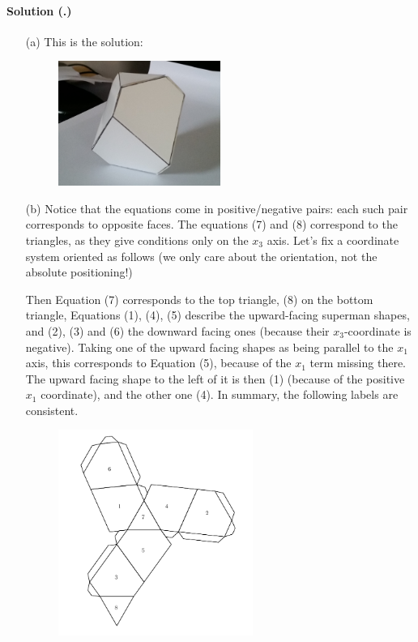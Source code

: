 \documentclass{article}
\newcounter{problemSheetNumber}
\newcounter{problems}
\renewcommand{\solution}[1]{\paragraph{Solution (\theproblemSheetNumber.\theproblems)}\addtocounter{problems}{1}\label{#1}}
\begin{document}
\solution{pr:2} 

\begin{itemize}
 \item[(a)] This is the solution:
\begin{figure}[h!]
 \centering
 \includegraphics[width=0.5\textwidth]{images/durerphoto.jpg}
\end{figure}
\item[(b)]  Notice that the equations come in positive/negative pairs: each such pair corresponds to opposite faces. The equations (7) and (8) correspond to the triangles, as they give conditions only on the $x_3$ axis.
Let's fix a coordinate system oriented as follows (we only care about the orientation, not the absolute positioning!)
\begin{figure}[h!]
\centering
{}
\end{figure}
Then Equation (7) corresponds to the top triangle, (8) on the bottom triangle, Equations (1), (4), (5) describe the upward-facing superman shapes, and (2), (3) and (6) the downward facing ones (because their $x_3$-coordinate is negative). Taking one of the upward facing shapes as being parallel to the $x_1$ axis, this corresponds to Equation (5), because of the $x_1$ term missing there. The upward facing shape to the left of it is then (1) (because of the positive $x_1$ coordinate), and the other one (4). In summary, the following labels are consistent.
\begin{figure}[h!]
 \centering
  \includegraphics[width=0.6\textwidth]{images/foldoutlabel_cropped.pdf}

\end{figure}
\end{itemize}
\end{document}
